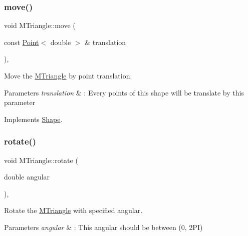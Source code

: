 \mbox{\label{classMTriangle_aa21f0514a8af2beba5ecf2ea5a22a4ef}} 
\subsubsection{\texorpdfstring{move()}{move()}}
{\footnotesize\ttfamily void M\+Triangle\+::move (\begin{DoxyParamCaption}\item[{const \hyperlink{classPoint}{Point}$<$ double $>$ \&}]{translation }\end{DoxyParamCaption})\hspace{0.3cm}{\ttfamily [override]}, {\ttfamily [virtual]}}



Move the \hyperlink{classMTriangle}{M\+Triangle} by point translation. 


\begin{DoxyParams}{Parameters}
{\em translation} & \+: Every points of this shape will be translate by this parameter \\
\hline
\end{DoxyParams}


Implements \hyperlink{classShape_a1f447acd6219cb10b9b7a40371519c46}{Shape}.

\mbox{\label{classMTriangle_a4be29553eeddf99c367b1ec220bc102b}} 
\subsubsection{\texorpdfstring{rotate()}{rotate()}}
{\footnotesize\ttfamily void M\+Triangle\+::rotate (\begin{DoxyParamCaption}\item[{double}]{angular }\end{DoxyParamCaption})\hspace{0.3cm}{\ttfamily [override]}, {\ttfamily [virtual]}}



Rotate the \hyperlink{classMTriangle}{M\+Triangle} with specified angular. 


\begin{DoxyParams}{Parameters}
{\em angular} & \+: This angular should be between (0, 2\+PI) \\
\hline
\end{DoxyParams}


